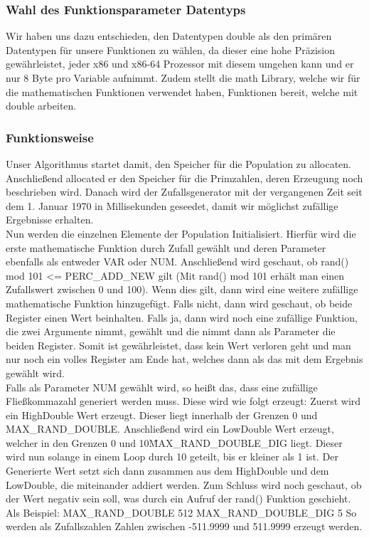 \documentclass[a4paper,12pt]{article}
\begin{document}
\subsubsection{Wahl des Funktionsparameter Datentyps}
Wir haben uns dazu entschieden, den Datentypen double als den primären Datentypen für unsere Funktionen zu wählen, da dieser eine hohe Präzision gewährleistet, jeder x86 und x86-64 Prozessor mit diesem umgehen kann und er nur 8 Byte pro Variable aufnimmt. Zudem stellt die math Library, welche wir für die mathematischen Funktionen verwendet haben, Funktionen bereit, welche mit double arbeiten. 

\subsubsection{Funktionsweise}
Unser Algorithmus startet damit, den Speicher für die Population zu allocaten. Anschließend allocated er den Speicher für die Primzahlen, deren Erzeugung noch beschrieben wird. Danach wird der Zufallsgenerator mit der vergangenen Zeit seit dem 1. Januar 1970 in Millisekunden geseedet, damit wir möglichst zufällige Ergebnisse erhalten. \\

Nun werden die einzelnen Elemente der Population Initialisiert. Hierfür wird die erste mathematische Funktion durch Zufall gewählt und deren Parameter ebenfalls als entweder VAR oder NUM. Anschließend wird geschaut, ob rand() mod 101 <= PERC\_ADD\_NEW gilt (Mit rand() mod 101 erhält man einen Zufallswert zwischen 0 und 100).  Wenn dies gilt, dann wird eine weitere zufällige mathematische Funktion hinzugefügt. Falls nicht, dann wird geschaut, ob beide Register einen Wert beinhalten. Falls ja, dann wird noch eine zufällige Funktion, die zwei Argumente nimmt, gewählt und die nimmt dann als Parameter die beiden Register. Somit ist gewährleistet, dass kein Wert verloren geht und man nur noch ein volles Register am Ende hat, welches dann als das mit dem Ergebnis gewählt wird. \\

Falls als Parameter NUM gewählt wird, so heißt das, dass eine zufällige Fließkommazahl generiert werden muss. Diese wird wie folgt erzeugt:
Zuerst wird ein HighDouble Wert erzeugt. Dieser liegt innerhalb der Grenzen 0 und MAX\_RAND\_DOUBLE. Anschließend wird ein LowDouble Wert erzeugt, welcher in den Grenzen 0 und 10\^MAX\_RAND\_DOUBLE\_DIG liegt. Dieser wird nun solange in einem Loop durch 10 geteilt, bis er kleiner als 1 ist. Der Generierte Wert setzt sich dann zusammen aus dem HighDouble und dem LowDouble, die miteinander addiert werden. Zum Schluss wird noch geschaut, ob der Wert negativ sein soll, was durch ein Aufruf der rand() Funktion geschieht. 
Als Beispiel:
MAX\_RAND\_DOUBLE 512
MAX\_RAND\_DOUBLE\_DIG 5
So werden als Zufallszahlen Zahlen zwischen -511.9999 und 511.9999 erzeugt werden. \\
\end{document}
